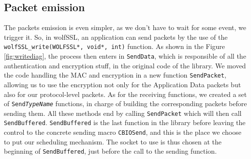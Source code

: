 \subsection{Packet emission}\label{sec:packet-emission}

The packets emission is even simpler, as we don't have to wait for some event, we trigger it. So, in wolfSSL, an application can send packets by the use of the \texttt{wolfSSL\_write(WOLFSSL*, void*, int)} function. As shown in the Figure \ref{fig:writediag}, the process then enters in \texttt{SendData}, which is responsible of all the authentication and encryption stuff, in the original code of the library. We moved the code handling the MAC and encryption in a new function \texttt{SendPacket}, allowing us to use the encryption not only for the Application Data packets but also for our protocol-level packets. As for the receiving functions, we created a set of \texttt{Send\textit{TypeName}} functions, in charge of building the corresponding packets before sending them. All these methods end by calling \texttt{SendPacket} which will then call \texttt{SendBuffered}. \texttt{SendBuffered} is the last function in the library before leaving the control to the concrete sending macro \texttt{CBIOSend}, and this is the place we choose to put our scheduling mechanism. The socket to use is thus chosen at the beginning of \texttt{SendBuffered}, just before the call to the sending function.

